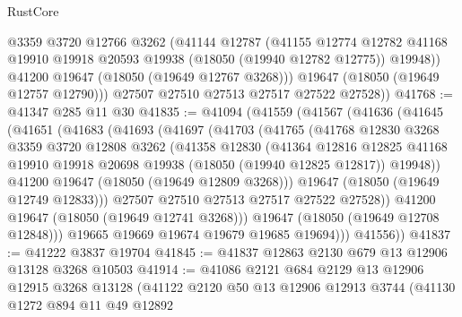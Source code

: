 \begin{lexlean}{RustCore}
\begin{coremodule}
            @3359
            @3720
            @12766
            @3262
            (@41144
              @12787
              (@41155
                @12774
                @12782
                @41168
                @19910
                @19918
                @20593
                @19938
                (@18050 (@19940 @12782 @12775))
                @19948))
            @41200
            @19647
            (@18050 (@19649 @12767 @3268)))
          @19647
          (@18050 (@19649 @12757 @12790)))
        @27507
        @27510
        @27513
        @27517
        @27522
        @27528))
@41768 := @41347 @285 @11 @30
@41835 := @41094
    (@41559
      (@41567
        (@41636
          (@41645
            (@41651
              (@41683
                (@41693
                  (@41697
                    (@41703
                      (@41765
                        (@41768
                          @12830
                          @3268
                          @3359
                          @3720
                          @12808
                          @3262
                          (@41358
                            @12830
                            (@41364
                              @12816
                              @12825
                              @41168
                              @19910
                              @19918
                              @20698
                              @19938
                              (@18050 (@19940 @12825 @12817))
                              @19948))
                          @41200
                          @19647
                          (@18050 (@19649 @12809 @3268)))
                        @19647
                        (@18050 (@19649 @12749 @12833)))
                      @27507
                      @27510
                      @27513
                      @27517
                      @27522
                      @27528))
                  @41200
                  @19647
                  (@18050 (@19649 @12741 @3268)))
                @19647
                (@18050 (@19649 @12708 @12848)))
              @19665
              @19669
              @19674
              @19679
              @19685
              @19694)))
        @41556))
@41837 := @41222 @3837 @19704
@41845 := @41837 @12863 @2130 @679 @13 @12906 @13128 @3268 @10503
@41914 := @41086
    @2121
    @684
    @2129
    @13
    @12906
    @12915
    @3268
    @13128
    (@41122
      @2120
      @50
      @13
      @12906
      @12913
      @3744
      (@41130
        @1272
        @894
        @11
        @49
        @12892

\end{coremodule}
\end{lexlean}
